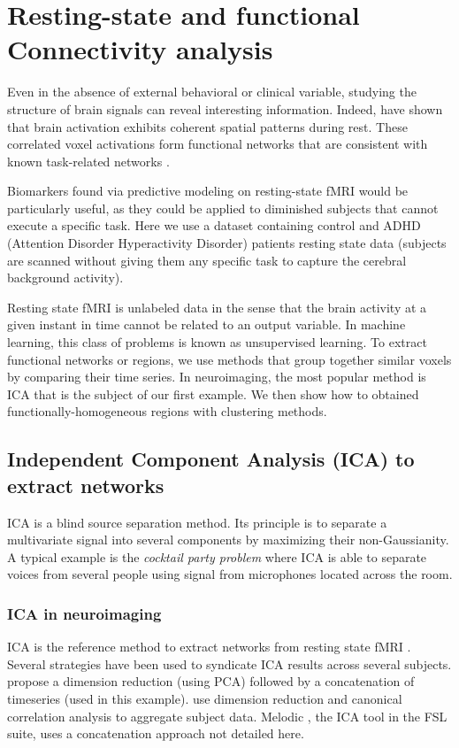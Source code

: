 \documentclass{frontiersSCNS} %
\begin{document}
\section{Resting-state and functional Connectivity analysis}

Even in the absence of external behavioral or clinical variable, studying
the structure of brain signals can reveal interesting information.
Indeed, \cite{biswal1995} have shown that brain activation exhibits
coherent spatial patterns during rest. These correlated voxel activations
form functional networks that are consistent with known task-related networks
\citep{smith2009}.

Biomarkers found via predictive modeling on resting-state fMRI would be
particularly useful, as they could be applied to diminished subjects that
cannot execute a specific task. Here we use a dataset containing control
and ADHD (Attention Disorder Hyperactivity Disorder) patients resting
state data (subjects are scanned without giving them any specific task to
capture the cerebral background activity).

Resting state fMRI is unlabeled data in the sense that the brain activity
at a given instant in time cannot be related to an output variable.
In machine learning, this class of problems is known as unsupervised
learning. 
To extract functional networks or regions, we use methods that group together 
similar voxels by comparing their time
series. In neuroimaging, the most popular method is ICA that
is the subject of our first example. We then show how to obtained 
functionally-homogeneous regions with
clustering methods.

\subsection{Independent Component Analysis (ICA) to extract networks}


ICA is a blind source separation method. Its principle is to separate a
multivariate signal into several components by maximizing their non-Gaussianity.
A typical example is the \emph{cocktail party problem} where ICA is able to separate
voices from several people using signal from microphones located across the room.

\subsubsection{ICA in neuroimaging}

ICA is the reference method to extract networks from resting state
fMRI \citep{kiviniemi2003}. Several strategies have been used to syndicate ICA
results across several subjects. \cite{calhoun2001a} propose a dimension
reduction (using PCA) followed by a concatenation of timeseries (used in this
example). \cite{varoquaux2010} use dimension reduction and canonical correlation analysis
to aggregate subject data. Melodic \citep{beckmann2004}, the ICA tool in
the FSL suite, uses a concatenation approach not detailed here.
\end{document}
